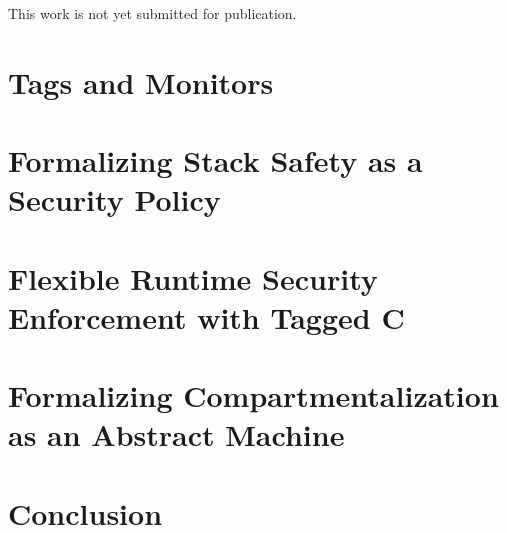 \documentclass{report}
\begin{document}
This work is not yet submitted for publication.

\chapter{Tags and Monitors}
\label{ch:background}

\chapter{Formalizing Stack Safety as a Security Policy}
\label{ch:stacksafety}

\chapter{Flexible Runtime Security Enforcement with Tagged C}
\label{ch:taggedc}

\chapter{Formalizing Compartmentalization as an Abstract Machine}
\label{ch:compartments}

\chapter{Conclusion}



\end{document}
